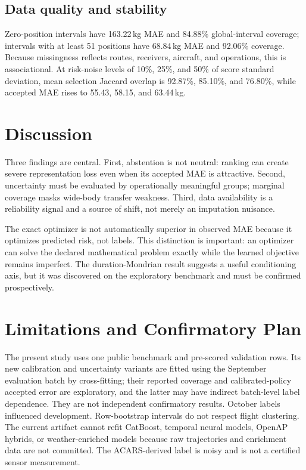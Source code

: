 \documentclass[11pt]{article}
\begin{document}
\subsection{Data quality and stability}
Zero-position intervals have 163.22\,kg MAE and 84.88\% global-interval coverage; intervals with at least 51 positions have 68.84\,kg MAE and 92.06\% coverage. Because missingness reflects routes, receivers, aircraft, and operations, this is associational. At risk-noise levels of 10\%, 25\%, and 50\% of score standard deviation, mean selection Jaccard overlap is 92.87\%, 85.10\%, and 76.80\%, while accepted MAE rises to 55.43, 58.15, and 63.44\,kg.

\section{Discussion}
Three findings are central. First, abstention is not neutral: ranking can create severe representation loss even when its accepted MAE is attractive. Second, uncertainty must be evaluated by operationally meaningful groups; marginal coverage masks wide-body transfer weakness. Third, data availability is a reliability signal and a source of shift, not merely an imputation nuisance.

The exact optimizer is not automatically superior in observed MAE because it optimizes predicted risk, not labels. This distinction is important: an optimizer can solve the declared mathematical problem exactly while the learned objective remains imperfect. The duration-Mondrian result suggests a useful conditioning axis, but it was discovered on the exploratory benchmark and must be confirmed prospectively.

\section{Limitations and Confirmatory Plan}
The present study uses one public benchmark and pre-scored validation rows. Its new calibration and uncertainty variants are fitted using the September evaluation batch by cross-fitting; their reported coverage and calibrated-policy accepted error are exploratory, and the latter may have indirect batch-level label dependence. They are not independent confirmatory results. October labels influenced development. Row-bootstrap intervals do not respect flight clustering. The current artifact cannot refit CatBoost, temporal neural models, OpenAP hybrids, or weather-enriched models because raw trajectories and enrichment data are not committed. The ACARS-derived label is noisy and is not a certified sensor measurement.
\end{document}

